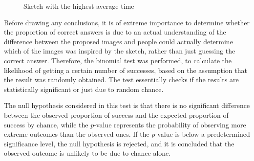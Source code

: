 \begin{figure}[!ht]
    \centering
     \quad
    \caption{Sketch with the highest average time}
    \label{fig:result sketch with highest average time}
\end{figure}

\noindent Before drawing any conclusions, it is of extreme importance to determine whether the proportion of correct answers is due to an actual understanding of the difference between the proposed images and people could actually determine which of the images was inspired by the sketch, rather than just guessing the correct answer. Therefore, the binomial test was performed, to calculate the likelihood of getting a certain number of successes, based on the assumption that the result was randomly obtained. The test essentially checks if the results are statistically significant or just due to random chance.

\noindent The null hypothesis considered in this test is that there is no significant difference between the observed proportion of success and the expected proportion of success by chance, while the $p$-value represents the probability of observing more extreme outcomes than the observed ones.
If the $p$-value is below a predetermined significance level, the null hypothesis is rejected, and it is concluded that the observed outcome is unlikely to be due to chance alone.


